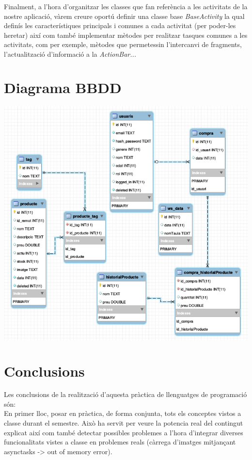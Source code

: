 \documentclass{article}
\begin{document}
	Finalment, a l'hora d'organitzar les classes que fan referència a les activitats de la nostre aplicació, vàrem creure oportú definir una classe base \textit{BaseActivity} la qual definís les característiques principals i comunes a cada activitat (per poder-les heretar) així com també implementar mètodes per realitzar tasques comunes a les activitats, com per exemple, mètodes que permetessin l'intercanvi de fragments, l'actualització d'informació a la \textit{ActionBar...}
	
\begin{center}
\end{center}

\section{Diagrama BBDD}
\begin{center}
	\includegraphics[scale=0.5]{img/Android_DB_Schema.png}
\end{center}

\newpage
\section{Conclusions}
Les conclusions de la realització d'aquesta pràctica de llenguatges de programació són:\\

En primer lloc, posar en pràctica, de forma conjunta, tots els conceptes vistos a classe durant el semestre. Això ha servit per veure la potencia real del contingut explicat així com també detectar possibles problemes a l'hora d'integrar diverses funcionalitats vistes a classe en problemes reals (càrrega d'imatges mitjançant asynctasks -> out of memory error).\\
\end{document}
